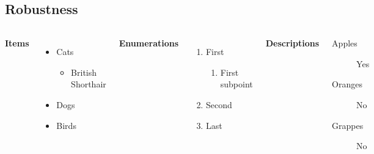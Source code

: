 \documentclass[
11pt,notheorems,compress,hyperref={pdfauthor=Maghfira Ramadhani}
]{beamer}
\begin{document}
\subsection{Robustness}
\begin{frame}
    \begin{columns}[T,onlytextwidth]
      \textbf{Items}
      \begin{itemize}
        \item Cats 
        \begin{itemize}
            \item British Shorthair
        \end{itemize}
        \item Dogs \item Birds
      \end{itemize}

      \textbf{Enumerations}
      \begin{enumerate}
        \item First 
        \begin{enumerate}
            \item First subpoint
        \end{enumerate}
        \item Second \item Last
      \end{enumerate}

      \textbf{Descriptions}
      \begin{description}
        \item[Apples] Yes \item[Oranges] No \item[Grappes] No
      \end{description}
\end{columns}
\end{frame}
\end{document}
